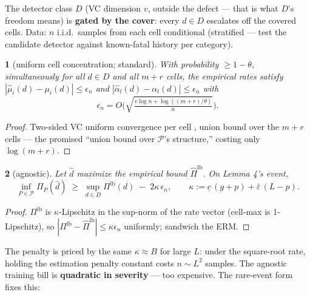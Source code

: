 \documentclass[11pt]{article}
\theoremstyle{plain}
\newtheorem*{namedthminner}{\namedthmname}
\newenvironment{nthm}[1]{\def\namedthmname{#1}\begin{namedthminner}}{\end{namedthminner}}
\theoremstyle{definition}
\begin{document}
The detector class $D$ (VC dimension $v$, outside the defect --- that is what
$D$'s freedom means) is \textbf{gated by the cover}: every $d \in D$ escalates
off the covered cells. Data: $n$ i.i.d.\ samples from each cell conditional
(stratified --- test the candidate detector against known-fatal history per
category).

\begin{nthm}{Lemma 4}[uniform cell concentration; standard]
With probability
$\geq 1-\theta$, simultaneously for all $d \in D$ and all $m + r$ cells, the
empirical rates satisfy $|\hat\mu_i(d) - \mu_i(d)| \leq \epsilon_n$ and
$|\hat\alpha_l(d) - \alpha_l(d)| \leq \epsilon_n$ with
$$\epsilon_n = O\!\Big(\sqrt{\tfrac{v \log n + \log((m+r)/\theta)}{n}}\Big).$$
\end{nthm}

\begin{proof}
Two-sided VC uniform convergence per cell \citep{vapnik1971}, union bound over
the $m+r$ cells --- the promised ``union bound over
$\mathcal{P}$'s structure,'' costing only $\log(m+r)$.
\end{proof}

\begin{nthm}{Theorem E}[agnostic]
Let $\hat d$ maximize the empirical bound
$\hat\Pi^{\mathrm{lb}}$. On Lemma 4's event,
$$\inf_{P \in \mathcal{P}} \Pi_P(\hat d) \;\geq\; \sup_{d \in D} \Pi^{\mathrm{lb}}(d) \;-\; 2\kappa\,\epsilon_n, \qquad \kappa := \underline c\,(g+p) + \bar\varepsilon\,(L-p).$$
\end{nthm}

\begin{proof}
$\Pi^{\mathrm{lb}}$ is $\kappa$-Lipschitz in the sup-norm of the
rate vector (cell-max is 1-Lipschitz), so $|\Pi^{\mathrm{lb}} -
\hat\Pi^{\mathrm{lb}}| \leq \kappa\epsilon_n$ uniformly; sandwich the ERM.
\end{proof}

The penalty is priced by the same $\kappa \approx B$ for large $L$: under the
square-root rate, holding the estimation penalty constant costs $n \sim L^2$
samples. The agnostic training bill is \textbf{quadratic in severity} --- too
expensive. The rare-event form fixes this:
\end{document}
